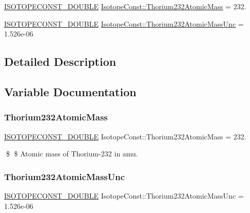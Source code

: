 \begin{DoxyCompactItemize}
\item 
\mbox{\hyperlink{group___isotope_const-_macros_ga8f45a7272ce02c0b4c65c44636ed719a}{I\+S\+O\+T\+O\+P\+E\+C\+O\+N\+S\+T\+\_\+\+D\+O\+U\+B\+LE}} \mbox{\hyperlink{group___isotope_const-_thorium-_th232_ga8adc56f22516c553eec892fa141a7aa1}{Isotope\+Const\+::\+Thorium232\+Atomic\+Mass}} = 232.
\item 
\mbox{\hyperlink{group___isotope_const-_macros_ga8f45a7272ce02c0b4c65c44636ed719a}{I\+S\+O\+T\+O\+P\+E\+C\+O\+N\+S\+T\+\_\+\+D\+O\+U\+B\+LE}} \mbox{\hyperlink{group___isotope_const-_thorium-_th232_gada80a3ac1563c48a0291315d9d5536bd}{Isotope\+Const\+::\+Thorium232\+Atomic\+Mass\+Unc}} = 1.\+526e-\/06
\end{DoxyCompactItemize}


\subsection{Detailed Description}


\subsection{Variable Documentation}
\mbox{\label{group___isotope_const-_thorium-_th232_ga8adc56f22516c553eec892fa141a7aa1}} 
\subsubsection{\texorpdfstring{Thorium232\+Atomic\+Mass}{Thorium232AtomicMass}}
{\footnotesize\ttfamily \mbox{\hyperlink{group___isotope_const-_macros_ga8f45a7272ce02c0b4c65c44636ed719a}{I\+S\+O\+T\+O\+P\+E\+C\+O\+N\+S\+T\+\_\+\+D\+O\+U\+B\+LE}} Isotope\+Const\+::\+Thorium232\+Atomic\+Mass = 232.}

\$ \$ Atomic mass of Thorium-\/232 in amu. \mbox{\label{group___isotope_const-_thorium-_th232_gada80a3ac1563c48a0291315d9d5536bd}} 
\subsubsection{\texorpdfstring{Thorium232\+Atomic\+Mass\+Unc}{Thorium232AtomicMassUnc}}
{\footnotesize\ttfamily \mbox{\hyperlink{group___isotope_const-_macros_ga8f45a7272ce02c0b4c65c44636ed719a}{I\+S\+O\+T\+O\+P\+E\+C\+O\+N\+S\+T\+\_\+\+D\+O\+U\+B\+LE}} Isotope\+Const\+::\+Thorium232\+Atomic\+Mass\+Unc = 1.\+526e-\/06}

